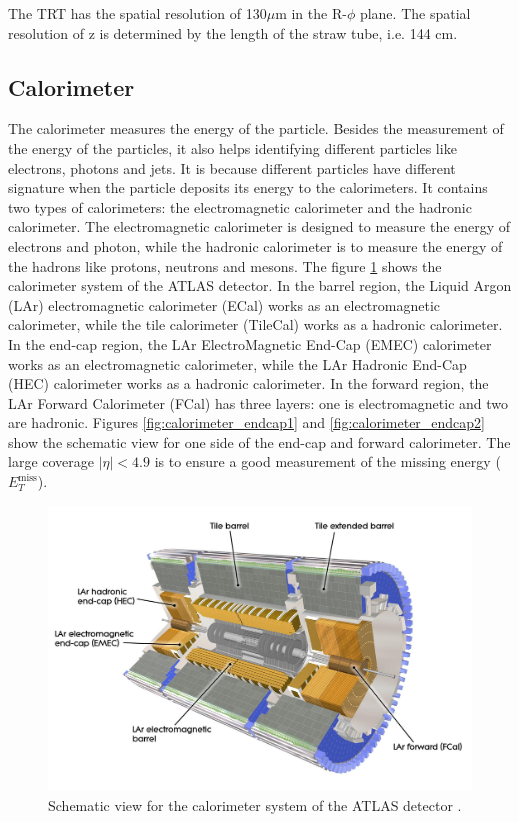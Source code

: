 The TRT has the spatial resolution of 130$\mu$m in the R-$\phi$ plane.
The spatial resolution of z is determined by the length of the straw tube, i.e. 144 cm.

\subsection{Calorimeter}
The calorimeter measures the energy of the particle.
Besides the measurement of the energy of the particles, it also helps identifying different particles like electrons, photons and jets.
It is because different particles have different signature when the particle deposits its energy to the calorimeters.
It contains two types of calorimeters: the electromagnetic calorimeter and the hadronic calorimeter.
The electromagnetic calorimeter is designed to measure the energy of electrons and photon, while the hadronic calorimeter is to measure the energy of the hadrons like protons, neutrons and mesons.
The figure \ref{fig:calorimeter_whole} shows the calorimeter system of the ATLAS detector.
In the barrel region, the Liquid Argon (LAr) electromagnetic calorimeter (ECal) works as an electromagnetic calorimeter, while the tile calorimeter (TileCal) works as a hadronic calorimeter.
In the end-cap region, the LAr ElectroMagnetic End-Cap (EMEC) calorimeter works as an electromagnetic calorimeter, while the LAr Hadronic End-Cap (HEC) calorimeter works as a hadronic calorimeter.
In the forward region, the LAr Forward Calorimeter (FCal) has three layers: one is electromagnetic and two are hadronic.
Figures \ref{fig:calorimeter_endcap1} and \ref{fig:calorimeter_endcap2} show the schematic view for one side of the end-cap and forward calorimeter.
The large coverage $|\eta| < 4.9$ is to ensure a good measurement of the missing energy ($E_T^{\text{miss}}$).

\begin{figure}
\centering
\includegraphics[width=\textwidth]{data/photo/detector/calorimeter_whole.jpg}
\caption{Schematic view for the calorimeter system of the ATLAS detector \cite{calorimeter_whole}.}
\label{fig:calorimeter_whole}
\end{figure}


